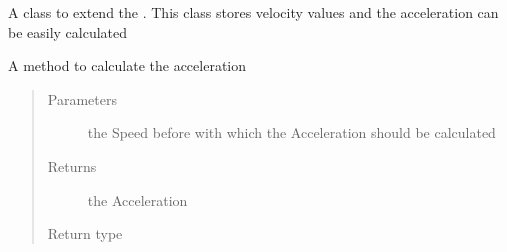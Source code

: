 \documentclass[letterpaper,10pt,english]{sphinxmanual}
\begin{document}
\begin{fulllineitems}
\label{\detokenize{data:lib.data.Speed}}
A class to extend the {\hyperref[\detokenize{data:lib.data.Data}]{}}. This class stores velocity values and the
acceleration can be easily calculated

\begin{fulllineitems}
\label{\detokenize{data:lib.data.Speed.acceleration}}
A method to calculate the acceleration
\begin{quote}\begin{description}
\item[{Parameters}] \leavevmode
{} \textendash{} the Speed before with which the Acceleration should be calculated

\item[{Returns}] \leavevmode
the Acceleration

\item[{Return type}] \leavevmode
{\hyperref[\detokenize{data:lib.data.Data}]{}}

\end{description}\end{quote}

\end{fulllineitems}


\end{fulllineitems}

\end{document}
